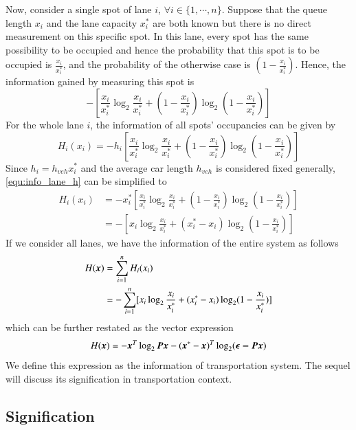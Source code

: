 \documentclass[preprint,authoryear,12pt]{elsarticle}
\renewcommand{\vec}[1]{\mbox{\boldmath$#1$}}
\newcommand{\mat}[1]{\mbox{\boldmath$#1$}}
\begin{document}
Now, consider a single spot of lane $i$, $\forall i\in\{1,\cdots,n\}$. Suppose that the queue length $x_i$ and the lane capacity $x_i^*$ are both known but there is no direct measurement on this specific spot. 
In this lane, every spot has the same possibility to be occupied and hence the probability that this spot is to be occupied is $\frac{x_i}{x_i^*}$, and the probability of the otherwise case is $(1-\frac{x_i}{x_i^*})$. Hence, the information gained by measuring this spot is
$$-[\frac{x_i}{x_i^*} \log_2 \frac{x_i}{x_i^*}+(1-\frac{x_i}{x_i^*})
\log_2 (1-\frac{x_i}{x_i^*})]
$$
For the whole lane $i$, the information of all spots' occupancies can be given by
\begin{equation}\label{equ:info_lane_h}
H_i(x_i) = -h_i[\frac{x_i}{x_i^*} \log_2
\frac{x_i}{x_i^*}+(1-\frac{x_i}{x_i^*}) \log_2 (1-\frac{x_i}{x_i^*})]
\end{equation}
Since $h_i=h_{veh} x_i^*$ and the average car length $h_{veh}$ is considered fixed generally, \eqref{equ:info_lane_h} can be simplified to
\begin{align}
H_i(x_i) &= -x_i^*[\frac{x_i}{x_i^*} \log_2
\frac{x_i}{x_i^*}+(1-\frac{x_i}{x_i^*}) \log_2
(1-\frac{x_i}{x_i^*})] \nonumber\\
&=-[x_i \log_2 \frac{x_i}{x_i^*}+(x_i^*-x_i) \log_2
(1-\frac{x_i}{x_i^*})] \label{equ:info_lane}
\end{align}
If we consider all lanes, we have the information of the entire system as follows
\begin{align}
H(\vec{x}) &= \sum_{i=1}^n H_i(x_i)\nonumber\\
&= - \sum_{i=1}^n [x_i \log_2 \frac{x_i}{x_i^*}+(x_i^*-x_i) \log_2
(1-\frac{x_i}{x_i^*})]\label{equ:info_network_sum}
\end{align}
which can be further restated as the vector expression
\begin{equation}\label{equ:info}
H(\vec{x}) = -\vec{x}^T\log_2\mat{P}\vec{x}
-(\vec{x}^*-\vec{x})^T\log_2(\vec{\epsilon-\mat{P}\vec{x}})
\end{equation}
We define this expression as the information of transportation system. The sequel will discuss its signification in transportation context.

\subsection{Signification}
\end{document}
